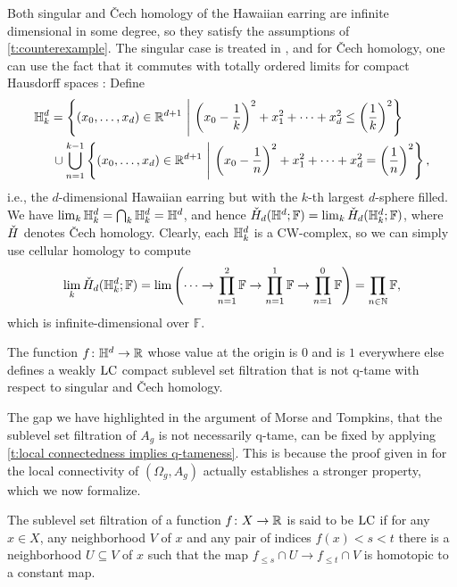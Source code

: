 Both singular and \v{C}ech homology of the Hawaiian earring are infinite dimensional in some degree, so they satisfy the assumptions of \cref{t:counterexample}.
The singular case is treated in \cite{Barratt.1962}, and for \v{C}ech homology, one can use the fact that it commutes with totally ordered limits for compact Hausdorff spaces \cite[Theorems VIII.3.6.\@ and X.3.1.]{Eilenberg.1952}:
Define 
\begin{align*}
\HE_k &=
\left\{ (x_0, \dots, x_d) \in \R^{d+1} \ \middle| \ \left( x_0 - \frac{1}{k} \right)^2 + x_1^2 + \dots + x_d^2 \leq \left( \frac{1}{k} \right)^2 \right\} \\ &\, \cup
\bigcup_{n=1}^{k-1} \left\{ (x_0, \dots, x_d) \in \R^{d+1} \ \middle |\ \left( x_0 - \frac{1}{n} \right)^2 + x_1^2 + \dots + x_d^2 = \left( \frac{1}{n} \right)^2 \right\},
\end{align*}
i.e., the $d$-dimensional Hawaiian earring but with the $k$-th largest $d$-sphere filled.
We have $\lim_{k} \mathbb{H}^d_{k} = \bigcap_{k} \mathbb{H}^d_{k} = \mathbb{H}^d$, and hence $\check{H}_{d}(\mathbb{H}^d; \mathbb{F}) = \lim_{k} \check{H}_{d}(\mathbb{H}^d_{k}; \mathbb{F})$, where $\check{H}$ denotes \v{C}ech homology.
Clearly, each $\mathbb{H}^d_{k}$ is a CW-complex, so we can simply use cellular homology to compute
\begin{equation*}
\lim_{k}\check{H}_{d}(\mathbb{H}^{d}_{k}; \mathbb{F})=\lim\left(\dots\to \prod_{n=1}^2\mathbb{F}\to \prod_{n=1}^1\mathbb{F}\to \prod_{n=1}^0\mathbb{F}\right)=\prod_{n\in\mathbb{N}}\mathbb{F},
\end{equation*}
which is infinite-dimensional over $\mathbb{F}$.

\begin{cor} \label{c:counterexample}
	The function $f \colon \mathbb{H}^d \to \mathbb{R}$ whose value at the origin is $0$ and is $1$ everywhere else defines a weakly $\mathrm{LC}$ compact sublevel set filtration that is not q-tame with respect to singular and \v{C}ech homology.
\end{cor}

The gap we have highlighted in the argument of Morse and Tompkins, that the sublevel set filtration of $A_g$ is not necessarily q-tame, can be fixed by applying \cref{t:local connectedness implies q-tameness}.
This is because the proof given in \cite[p.464]{Morse.1939} for the local connectivity of $(\Omega_g, A_g)$ actually establishes a stronger property, which we now formalize.

\begin{defi}
	The sublevel set filtration of a function $f \colon X \to \mathbb{R}$ is said to be $\mathrm{LC}$ if for any $x \in X$, any neighborhood $V$ of $x$ and any pair of indices $f(x) < s < t$ there is a neighborhood $U \subseteq V$ of $x$ such that the map $f_{\leq s} \cap U \to f_{\leq t} \cap V$ is homotopic to a constant map.
\end{defi}

